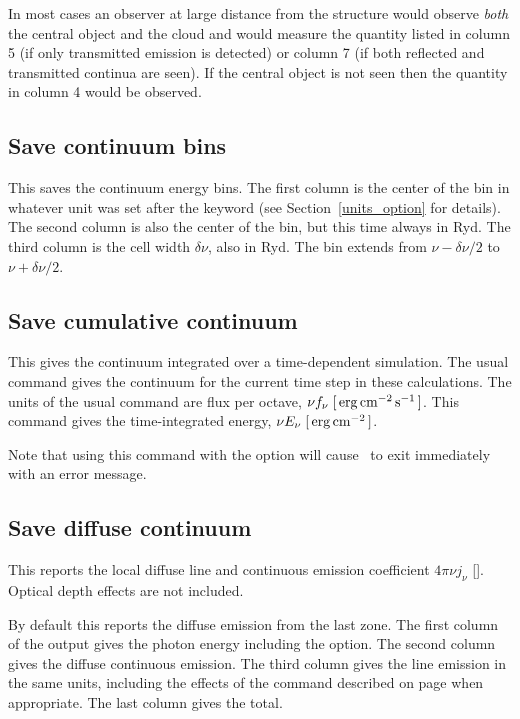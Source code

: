 In most cases an observer at large distance from the structure would
observe \emph{both} the central object and the cloud and would measure the quantity
listed in column 5 (if only transmitted emission is detected) or column
7 (if both reflected and transmitted continua are seen).  If the central
object is not seen then the quantity in column 4 would be observed.

\subsection{Save continuum bins}

This saves the continuum energy bins.
The first column is the center
of the bin in whatever unit was set after the  keyword
(see Section~\ref{units_option} for details).
The second column is also the center of the bin, but this time always in Ryd.
The third column is the cell width $\delta\nu$, also in Ryd.
The bin extends from $\nu-\delta\nu/2$ to $\nu+\delta\nu/2$.

\subsection{Save cumulative continuum}
\label{sec:CommandSaveCumulativeContinuum}

This gives the continuum integrated over a time-dependent simulation.
The usual  command gives the
continuum for the current time step in these calculations.
The units of the usual  command
are flux per octave, $\nu f_{\nu}\; [\mbox{${\rm\thinspace erg}{\rm\thinspace cm}^{-2}{\rm\thinspace s}^{-1}\,$} ]$.
This command gives the time-integrated energy,
$\nu E_{\nu}\; [\mbox{${\rm\thinspace erg}{\rm\thinspace cm}^{-2}\,$} ]$.

\par
Note that using this command with the option 
will cause \Cloudy\ to exit immediately with an error message.

\subsection{Save diffuse continuum}

This reports the local diffuse line and continuous emission
coefficient $4 \pi \nu j_{\nu}$ [\ergpccmps ].
Optical depth effects are not included.

By default this reports the diffuse emission from the last zone.
The first column of the output gives
the photon energy including the  option.
The second column gives the diffuse continuous emission.
The third column gives the line emission in the same units,
including the effects of the
 command described on page
\pageref{sec:CommandSetSaveLWidth} when appropriate.
The last column gives the total.

